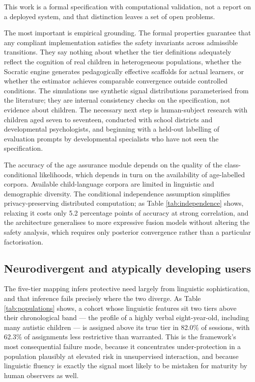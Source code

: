 \documentclass[fleqn,10pt]{wlscirep}
\begin{document}
This work is a formal specification with computational validation, not a report on a deployed system, and that distinction leaves a set of open problems.

The most important is empirical grounding. The formal properties guarantee that any compliant implementation satisfies the safety invariants across admissible transitions. They say nothing about whether the tier definitions adequately reflect the cognition of real children in heterogeneous populations, whether the Socratic engine generates pedagogically effective scaffolds for actual learners, or whether the estimator achieves comparable convergence outside controlled conditions. The simulations use synthetic signal distributions parameterised from the literature; they are internal consistency checks on the specification, not evidence about children. The necessary next step is human-subject research with children aged seven to seventeen, conducted with school districts and developmental psychologists, and beginning with a held-out labelling of evaluation prompts by developmental specialists who have not seen the specification.

The accuracy of the age assurance module depends on the quality of the class-conditional likelihoods, which depends in turn on the availability of age-labelled corpora. Available child-language corpora are limited in linguistic and demographic diversity. The conditional independence assumption simplifies privacy-preserving distributed computation; as Table \ref{tab:independence} shows, relaxing it costs only 5.2 percentage points of accuracy at strong correlation, and the architecture generalises to more expressive fusion models without altering the safety analysis, which requires only posterior convergence rather than a particular factorisation.

\subsection*{Neurodivergent and atypically developing users}

The five-tier mapping infers protective need largely from linguistic sophistication, and that inference fails precisely where the two diverge. As Table \ref{tab:populations} shows, a cohort whose linguistic features sit two tiers above their chronological band --- the profile of a highly verbal eight-year-old, including many autistic children --- is assigned above its true tier in 82.0\% of sessions, with 62.3\% of assignments less restrictive than warranted. This is the framework's most consequential failure mode, because it concentrates under-protection in a population plausibly at elevated risk in unsupervised interaction, and because linguistic fluency is exactly the signal most likely to be mistaken for maturity by human observers as well.
\end{document}
